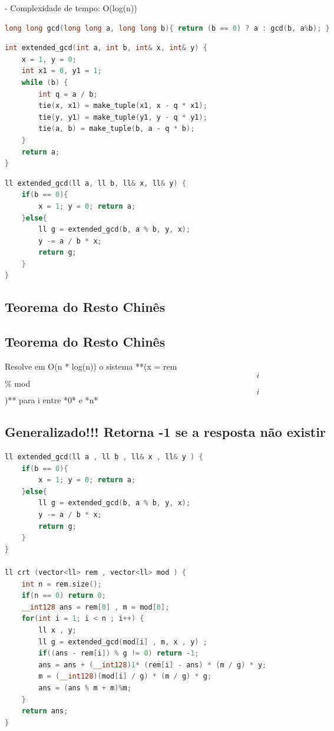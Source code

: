 \documentclass[11pt, a4paper, twoside]{article}
\begin{document}
- Complexidade de tempo: O(log(n))

\begin{lstlisting}[language=C++]
long long gcd(long long a, long long b){ return (b == 0) ? a : gcd(b, a%b); }
\end{lstlisting}

\begin{multicols}{2}
\begin{lstlisting}[language=C++]
int extended_gcd(int a, int b, int& x, int& y) {
    x = 1, y = 0;
    int x1 = 0, y1 = 1;
    while (b) {
        int q = a / b;
        tie(x, x1) = make_tuple(x1, x - q * x1);
        tie(y, y1) = make_tuple(y1, y - q * y1);
        tie(a, b) = make_tuple(b, a - q * b);
    }
    return a;
}
\end{lstlisting}
\end{multicols}

\begin{multicols}{2}
\begin{lstlisting}[language=C++]
ll extended_gcd(ll a, ll b, ll& x, ll& y) {
    if(b == 0){
        x = 1; y = 0; return a;
    }else{
        ll g = extended_gcd(b, a % b, y, x);
        y -= a / b * x;
        return g;
    }
}
\end{lstlisting}
\end{multicols}

\subsection{Teorema do Resto Chinês}

\subsection{Teorema do Resto Chinês}


Resolve em O(n * log(n)) o sistema **(x = rem\[i\] \% mod\[i\])** para i entre *0* e *n*

\subsection{Generalizado!!! Retorna -1 se a resposta não existir}


\begin{lstlisting}[language=C++]
ll extended_gcd(ll a , ll b , ll& x , ll& y ) {
    if(b == 0){
        x = 1; y = 0; return a;
    }else{
        ll g = extended_gcd(b, a % b, y, x);
        y -= a / b * x;
        return g;
    }
}

ll crt (vector<ll> rem , vector<ll> mod ) {
    int n = rem.size();
    if(n == 0) return 0;
    __int128 ans = rem[0] , m = mod[0];
    for(int i = 1; i < n ; i++) {
        ll x , y;
        ll g = extended_gcd(mod[i] , m, x , y) ;
        if((ans - rem[i]) % g != 0) return -1;
        ans = ans + (__int128)1* (rem[i] - ans) * (m / g) * y;
        m = (__int128)(mod[i] / g) * (m / g) * g;
        ans = (ans % m + m)%m;
    }
    return ans;
}
\end{lstlisting}
\end{document}
